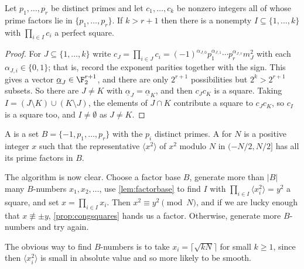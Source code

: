\begin{lemma}\label{lem:factorbase}
	Let $p_1, \dots, p_r$ be distinct primes and let $c_1, \dots, c_k$ be nonzero integers all of whose prime factors lie in $\{p_1, \dots, p_r\}$. If $k > r+1$ then there is a nonempty $I \subseteq \{1, \dots, k\}$ with $\prod_{i \in I}c_i$ a perfect square.
\end{lemma}
\begin{proof}
	For $J \subseteq \{1, \dots, k\}$ write $c_J = \prod_{i \in J}c_i = (-1)^{\alpha_{J,0}}p_1^{\alpha_{J,1}}\cdots p_r^{\alpha_{J,r}}m_J^2$ with each $\alpha_{J,i} \in \{0,1\}$; that is, record the exponent parities together with the sign. This gives a vector $\underline\alpha_J \in \F_2^{r+1}$, and there are only $2^{r+1}$ possibilities but $2^k > 2^{r+1}$ subsets. So there are $J \neq K$ with $\underline\alpha_J = \underline\alpha_K$, and then $c_Jc_K$ is a square. Taking $I = (J\setminus K)\cup(K\setminus J)$, the elements of $J \cap K$ contribute a square to $c_Jc_K$, so $c_I$ is a square too, and $I \neq \emptyset$ as $J \neq K$.
\end{proof}

\begin{definition}
	A  is a set $B = \{-1, p_1, \dots, p_r\}$ with the $p_i$ distinct primes. A  for $N$ is a positive integer $x$ such that the representative $\langle x^2\rangle$ of $x^2$ modulo $N$ in $(-N/2, N/2]$ has all its prime factors in $B$.
\end{definition}

The algorithm is now clear. Choose a factor base $B$, generate more than $|B|$ many $B$-numbers $x_1, x_2, \dots$, use \autoref{lem:factorbase} to find $I$ with $\prod_{i \in I}\langle x_i^2\rangle = y^2$ a square, and set $x = \prod_{i \in I}x_i$. Then $x^2 \equiv y^2 \pmod N$, and if we are lucky enough that $x \not\equiv\pm y$, \autoref{prop:congsquares} hands us a factor. Otherwise, generate more $B$-numbers and try again.

The obvious way to find $B$-numbers is to take $x_i = \lceil\sqrt{kN}\rceil$ for small $k \geq 1$, since then $\langle x_i^2\rangle$ is small in absolute value and so more likely to be smooth.

